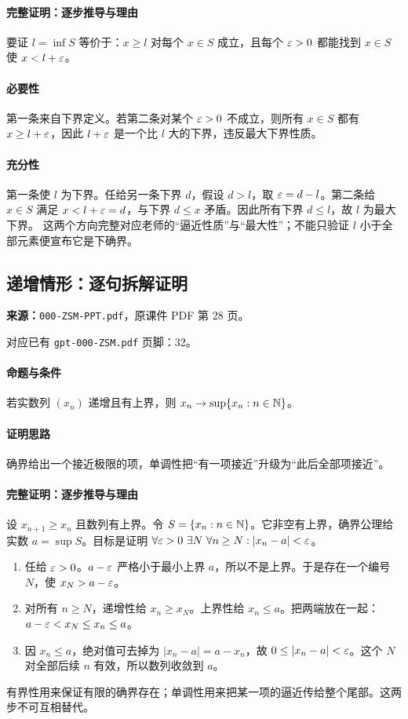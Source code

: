 \paragraph{完整证明：逐步推导与理由}

要证 $l=\inf S$ 等价于：$x\ge l$ 对每个 $x\in S$ 成立，且每个 $\varepsilon>0$ 都能找到 $x\in S$ 使 $x<l+\varepsilon$。
\paragraph{必要性}第一条来自下界定义。若第二条对某个 $\varepsilon>0$ 不成立，则所有 $x\in S$ 都有 $x\ge l+\varepsilon$，因此 $l+\varepsilon$ 是一个比 $l$ 大的下界，违反最大下界性质。
\paragraph{充分性}第一条使 $l$ 为下界。任给另一条下界 $d$，假设 $d>l$，取 $\varepsilon=d-l$。第二条给 $x\in S$ 满足 $x<l+\varepsilon=d$，与下界 $d\le x$ 矛盾。因此所有下界 $d\le l$，故 $l$ 为最大下界。
这两个方向完整对应老师的“逼近性质”与“最大性”；不能只验证 $l$ 小于全部元素便宣布它是下确界。

\clearpage\subsection{递增情形：逐句拆解证明}
\textbf{来源：}\texttt{000-ZSM-PPT.pdf}，原课件 PDF 第 28 页。\par
对应已有 \texttt{gpt-000-ZSM.pdf} 页脚：32。\par
\paragraph{命题与条件}若实数列 $(x_n)$ 递增且有上界，则 $x_n\to\sup\{x_n:n\in\mathbb{N}\}$。
\paragraph{证明思路}确界给出一个接近极限的项，单调性把“有一项接近”升级为“此后全部项接近”。
\paragraph{完整证明：逐步推导与理由}

设 $x_{n+1}\ge x_n$ 且数列有上界。令 $S=\{x_n:n\in\mathbb{N}\}$。它非空有上界，确界公理给实数 $a=\sup S$。目标是证明 $\forall\varepsilon>0\ \exists N\ \forall n\ge N:|x_n-a|<\varepsilon$。
\begin{enumerate}
\item 任给 $\varepsilon>0$。$a-\varepsilon$ 严格小于最小上界 $a$，所以不是上界。于是存在一个编号 $N$，使 $x_N>a-\varepsilon$。
\item 对所有 $n\ge N$，递增性给 $x_n\ge x_N$。上界性给 $x_n\le a$。把两端放在一起：$a-\varepsilon<x_N\le x_n\le a$。
\item 因 $x_n\le a$，绝对值可去掉为 $|x_n-a|=a-x_n$，故 $0\le|x_n-a|<\varepsilon$。这个 $N$ 对全部后续 $n$ 有效，所以数列收敛到 $a$。
\end{enumerate}
有界性用来保证有限的确界存在；单调性用来把某一项的逼近传给整个尾部。这两步不可互相替代。

